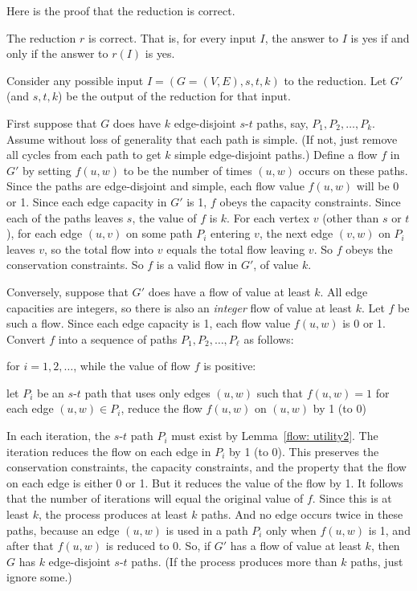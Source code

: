 Here is the proof that the reduction is correct.
\begin{lemma}
  The reduction $r$ is correct.  That is, for every input $I$,
  the answer to $I$ is \textsf{yes} if and only if the answer to $r(I)$ is \textsf{yes}.
\end{lemma}
\begin{shortFormProof}
  Consider any possible input $I=(G=(V, E), s, t, k)$ to the reduction.
  Let $G'$ (and $s, t, k$) be the output of the reduction for that input.

  First suppose that $G$ does have $k$ edge-disjoint $s$-$t$ paths,
  say, $P_1, P_2, \ldots, P_k$.
  Assume without loss of generality that each path is simple.
  (If not, just remove all cycles from each path to get $k$ simple edge-disjoint paths.)
  Define a flow $f$ in $G'$ by setting $f(u, w)$ to be the number
  of times $(u,w)$ occurs on these paths.
  Since the paths are edge-disjoint and simple,
  each flow value $f(u,w)$ will be 0 or 1.
  Since each edge capacity  in $G'$ is 1, $f$ obeys the capacity constraints.
  Since each of the paths leaves $s$,
  the value of $f$ is $k$.
  For each vertex $v$ (other than $s$ or $t$),
  for each edge $(u, v)$ on some path $P_i$ entering $v$,
  the next edge $(v, w)$ on $P_i$ leaves $v$,
  so the total flow into $v$ equals the total flow leaving $v$.
  So $f$ obeys the conservation constraints.
  So $f$ is a valid flow in $G'$, of value $k$.

  Conversely, suppose that $G'$ does have a flow of value at least $k$.
  All edge capacities are integers, 
  so there is also an \emph{integer} flow of value at least $k$.
  Let $f$ be such a flow.
  Since each edge capacity is 1, each flow value $f(u,w)$ is 0 or 1.
  Convert $f$ into a sequence of paths $P_1, P_2, \ldots, P_\ell$ as follows:
  \begin{myframed}
    \begin{steps}
      \step for $i= 1, 2, \ldots$, while the value of flow $f$ is positive:
      \begin{block}
        \step let $P_i$ be an $s$-$t$ path that uses only edges $(u,w)$ such that $f(u,w)=1$
        \step for each edge $(u,w)\in P_i$, reduce the flow $f(u,w)$ on $(u,w)$ by 1 (to 0)
      \end{block}
    \end{steps}
  \end{myframed}
  In each iteration, the $s$-$t$ path $P_i$ must exist by Lemma~\ref{flow: utility2}.
  The iteration reduces the flow on each edge in $P_i$ by 1 (to 0).
  This preserves the conservation constraints, the capacity constraints,
  and the property that the flow on each edge is either 0 or 1.
  But it reduces the value of the flow by 1.
  It follows that the number of iterations will equal the original value of $f$.
  Since this is at least $k$, the process produces at least $k$ paths.
  And no edge occurs twice in these paths,
  because an edge $(u,w)$ is used in a path $P_i$ only when $f(u,w)$ is 1,
  and after that $f(u,w)$ is reduced to 0.
  So, if $G'$ has a flow of value at least $k$,
  then $G$ has $k$ edge-disjoint $s$-$t$ paths.
  (If the process produces more than $k$ paths, just ignore some.)
\end{shortFormProof}

